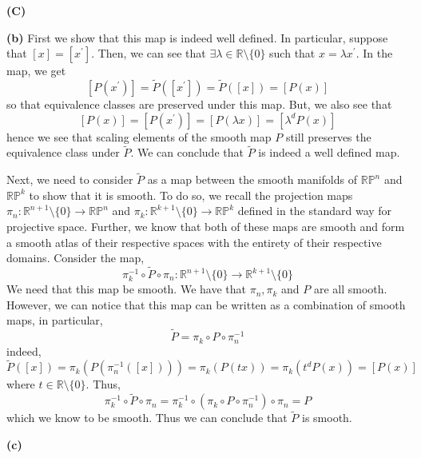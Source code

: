 \documentclass[10pt]{article}
\newcommand{\R}{\mathbb{R}}
\newcommand{\Pro}{\mathbb{P}}
\begin{document}
\textbf{(C)}

\textbf{(b)} First we show that this map is indeed well defined. In particular, suppose that $[x] = [x^{\prime}]$. Then, we can see that $\exists \lambda \in \R\setminus \{0\}$ such that $x = \lambda x^{\prime}$. In the map, we get
$$[P(x^{\prime})] = \tilde{P}([x^{\prime}]) = \tilde{P}([x]) = [P(x)]$$
so that equivalence classes are preserved under this map. But, we also see that
$$[P(x)] = [P(x^{\prime})] = [P(\lambda x)] = [\lambda^{d}P(x)]$$
hence we see that scaling elements of the smooth map $P$ still preserves the equivalence class under $\tilde{P}$. We can conclude that $\tilde{P}$ is indeed a well defined map.

Next, we need to consider $\tilde{P}$ as a map between the smooth manifolds of $\R\Pro^{n}$ and $\R\Pro^{k}$ to show that it is smooth. To do so, we recall the projection maps $\pi_{n}: \R^{n+1}\setminus\{0\} \to \R\Pro^{n}$ and $\pi_{k}: \R^{k+1}\setminus\{0\} \to \R\Pro^{k}$ defined in the standard way for projective space. Further, we know that both of these maps are smooth and form a smooth atlas of their respective spaces with the entirety of their respective domains. Consider the map,
$$\pi_{k}^{-1} \circ \tilde{P} \circ \pi_{n}: \R^{n+1}\setminus\{0\} \to \R^{k+1}\setminus \{0\}$$
We need that this map be smooth. We have that $\pi_{n},\pi_{k}$ and $P$ are all smooth. However, we can notice that this map can be written as a combination of smooth maps, in particular,
$$\tilde{P} = \pi_{k} \circ P \circ \pi_{n}^{-1}$$
indeed,
$$\tilde{P}([x]) = \pi_{k}\left(P\left(\pi_{n}^{-1}\left([x]\right)\right)\right) = \pi_{k}\left(P(tx)\right) = \pi_{k}\left(t^{d}P(x)\right) = [P(x)]$$
where $t\in \R\setminus \{0\}$. Thus,
$$\pi_{k}^{-1} \circ \tilde{P} \circ \pi_{n} = \pi_{k}^{-1} \circ \left(\pi_{k} \circ P \circ \pi_{n}^{-1}\right) \circ \pi_{n} = P$$
which we know to be smooth. Thus we can conclude that $\tilde{P}$ is smooth.

\textbf{(c)}
\end{document}
